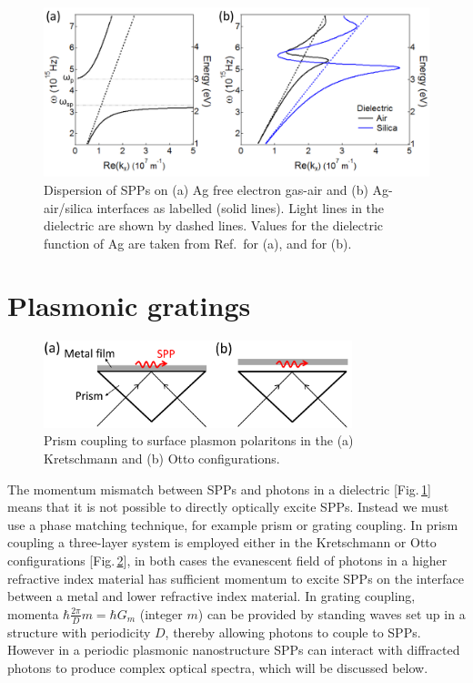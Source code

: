 \begin{figure}[h!] 
\centering    
\includegraphics[width=\textwidth]{Fig2}
\caption{Dispersion of SPPs on (a) Ag free electron gas-air and (b) Ag-air/silica interfaces as labelled (solid lines). Light lines in the dielectric are shown by dashed lines. Values for the dielectric function of Ag are taken from Ref.\,\cite{Zeman1987} for (a), and \cite{Johnson1972} for (b).}
\label{3Fig2}
\end{figure}


\section{Plasmonic gratings}
\label{sec:plasmonicgratings}
\begin{figure}[h!]
\centering
\includegraphics[width=0.8\textwidth]{PrismCoupling}
\caption{Prism coupling to surface plasmon polaritons in the (a) Kretschmann and (b) Otto configurations.}
\label{PrismCoupling}
\end{figure}
The momentum mismatch between SPPs and photons in a dielectric [Fig.\,\ref{3Fig2}] means that it is not possible to directly optically excite SPPs. Instead we must use a phase matching technique, for example prism or grating coupling. In prism coupling a three-layer system is employed either in the Kretschmann or Otto configurations [Fig.\,\ref{PrismCoupling}], in both cases the evanescent field of photons in a higher refractive index material has sufficient momentum to excite SPPs on the interface between a metal and lower refractive index material. In grating coupling, momenta $\hbar\frac{2\pi}{D}m = \hbar G_m$ (integer $m$) can be provided by standing waves set up in a structure with periodicity $D$, thereby allowing photons to couple to SPPs. However in a periodic plasmonic nanostructure SPPs can interact with diffracted photons to produce complex optical spectra, which will be discussed below.

